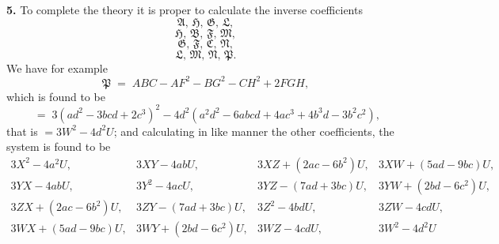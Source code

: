\documentclass[11pt,a4paper]{article}
\begin{document}
\medskip

\textbf{5.} To complete the theory it is proper to calculate the inverse coefficients
\[
\mathfrak{A},\,\mathfrak{H},\,\mathfrak{G},\,\mathfrak{L},
\]
\[
\mathfrak{H},\,\mathfrak{B},\,\mathfrak{F},\,\mathfrak{M},
\]
\[
\mathfrak{G},\,\mathfrak{F},\,\mathfrak{C},\,\mathfrak{N},
\]
\[
\mathfrak{L},\,\mathfrak{M},\,\mathfrak{N},\,\mathfrak{P}.
\]
We have for example
\[
\mathfrak{P} \;=\; ABC - AF^2 - BG^2 - CH^2 + 2FGH,
\]
which is found to be
\[
\;=\; 3(ad^2 - 3bcd + 2c^3)^2 - 4d^2(a^2 d^2 - 6abcd + 4ac^3 + 4b^3 d - 3b^2 c^2),
\]
that is $= 3W^2 - 4d^2 U$; and calculating in like manner the other coefficients, the system is found to be
\[
\begin{array}{cccc}
3X^2 - 4a^2 U, & 3XY - 4ab U, & 3XZ + (2ac - 6b^2)U, & 3XW + (5ad - 9bc)U, \\
3YX - 4ab U, & 3Y^2 - 4ac U, & 3YZ - (7ad + 3bc)U, & 3YW + (2bd - 6c^2)U, \\
3ZX + (2ac - 6b^2)U, & 3ZY - (7ad + 3bc)U, & 3Z^2 - 4bd U, & 3ZW - 4cd U, \\
3WX + (5ad - 9bc)U, & 3WY + (2bd - 6c^2)U, & 3WZ - 4cd U, & 3W^2 - 4d^2 U
\end{array}
\]

\medskip
\end{document}
